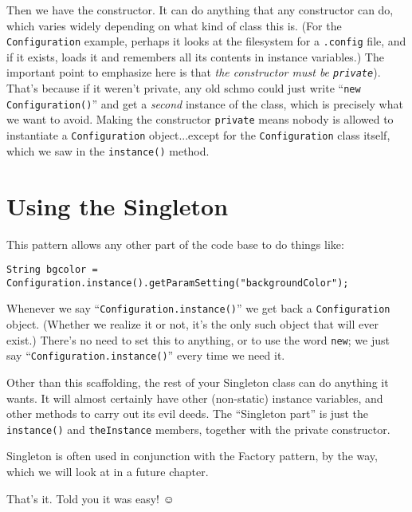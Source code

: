 Then we have the constructor. It can do anything that any constructor can do,
which varies widely depending on what kind of class this is. (For the
\texttt{Configuration} example, perhaps it looks at the filesystem for a
\texttt{.config} file, and if it exists, loads it and remembers all its
contents in instance variables.) The important point to emphasize here is that
\textit{the constructor must be \texttt{private}}). That's because if it
weren't private, any old schmo could just write ``\texttt{new
Configuration()}'' and get a \textit{second} instance of the class, which is
precisely what we want to avoid. Making the constructor \texttt{private} means
nobody is allowed to instantiate a \texttt{Configuration} object...except for
the \texttt{Configuration} class itself, which we saw in the
\texttt{instance()} method.


\section{Using the Singleton}

This pattern allows any other part of the code base to do things like:

\begin{Verbatim}[fontsize=\footnotesize,samepage=true,frame=single]
  String bgcolor = Configuration.instance().getParamSetting("backgroundColor");
\end{Verbatim}

Whenever we say ``\texttt{Configuration.instance()}'' we get back a
\texttt{Configuration} object. (Whether we realize it or not, it's the only
such object that will ever exist.) There's no need to set this to anything, or
to use the word \texttt{new}; we just say ``\texttt{Configuration.instance()}''
every time we need it.

Other than this scaffolding, the rest of your Singleton class can do anything
it wants. It will almost certainly have other (non-static) instance variables,
and other methods to carry out its evil deeds. The ``Singleton part'' is just
the \texttt{instance()} and \texttt{theInstance} members, together with the
private constructor.

Singleton is often used in conjunction with the Factory pattern, by the way,
which we will look at in a future chapter.

That's it. Told you it was easy! $\smiley$
